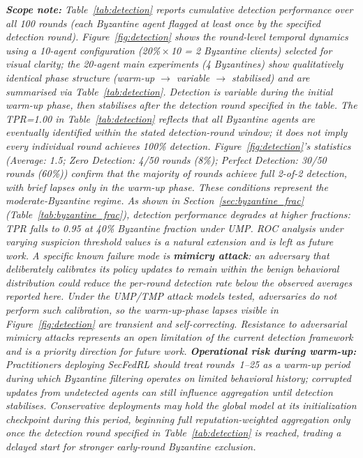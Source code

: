 \documentclass[12pt,a4paper]{article}
\begin{document}
\smallskip\noindent\textit{\textbf{Scope note:} Table~\ref{tab:detection} reports
cumulative detection performance over all 100 rounds (each Byzantine agent flagged at
least once by the specified detection round). Figure~\ref{fig:detection} shows the
round-level temporal dynamics using a 10-agent configuration (20\%\,$\times$\,10 = 2
Byzantine clients) selected for visual clarity; the 20-agent main experiments (4
Byzantines) show qualitatively identical phase structure (warm-up $\to$ variable $\to$
stabilised) and are summarised via Table~\ref{tab:detection}. Detection is variable
during the initial warm-up phase, then stabilises after the detection round specified
in the table. The TPR=1.00 in Table~\ref{tab:detection} reflects that all Byzantine
agents are eventually identified within the stated detection-round window; it does not
imply every individual round achieves 100\% detection. Figure~\ref{fig:detection}'s
statistics (Average: 1.5; Zero Detection: 4/50 rounds (8\%); Perfect Detection: 30/50
rounds (60\%)) confirm that the majority of rounds achieve full 2-of-2 detection, with
brief lapses only in the warm-up phase. These conditions represent the moderate-Byzantine
regime. As shown in Section~\ref{sec:byzantine_frac} (Table~\ref{tab:byzantine_frac}),
detection performance degrades at higher fractions: TPR falls to 0.95 at 40\% Byzantine
fraction under UMP. ROC analysis under varying suspicion threshold values is a natural
extension and is left as future work. A specific known failure mode is \textbf{mimicry
attack}: an adversary that deliberately calibrates its policy updates to remain within
the benign behavioral distribution could reduce the per-round detection rate below the
observed averages reported here. Under the UMP/TMP attack models tested, adversaries do
not perform such calibration, so the warm-up-phase lapses visible in
Figure~\ref{fig:detection} are transient and self-correcting. Resistance to adversarial
mimicry attacks represents an open limitation of the current detection framework and is
a priority direction for future work. \textbf{Operational risk during warm-up:}
Practitioners deploying SecFedRL should treat rounds~1--25 as a warm-up period during which
Byzantine filtering operates on limited behavioral history; corrupted updates from
undetected agents can still influence aggregation until detection stabilises.
Conservative deployments may hold the global model at its initialization checkpoint
during this period, beginning full reputation-weighted aggregation only once the
detection round specified in Table~\ref{tab:detection} is reached, trading a
delayed start for stronger early-round Byzantine exclusion.}
\end{document}
